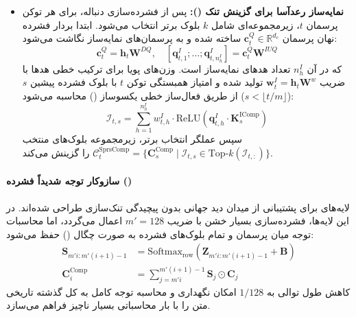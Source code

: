 \begin{itemize}
    \item \textbf{نمایه‌ساز رعدآسا برای گزینش تنک ():} پس از فشرده‌سازی دنباله، برای هر توکن پرسمان $t$، زیرمجموعه‌ای شامل $k$ بلوک برتر انتخاب می‌شود. ابتدا بردار فشرده نهان پرسمان $\mathbf{c}_t^Q \in \mathbb{R}^{d_c}$ ساخته شده و به پرسمان‌های نمایه‌ساز نگاشت می‌شود:
    \begin{equation}
        \mathbf{c}_t^Q = \mathbf{h}_t \mathbf{W}^{DQ}, \quad [\mathbf{q}_{t,1}^I; \dots; \mathbf{q}_{t,n_h^I}^I] = \mathbf{c}_t^Q \mathbf{W}^{IUQ}
    \end{equation}
    که در آن $n_h^I$ تعداد هدهای نمایه‌ساز است. وزن‌های پویا برای ترکیب خطی هدها با ضریب $\mathbf{w}_t^I = \mathbf{h}_t \mathbf{W}^w$ تولید شده و امتیاز همبستگی توکن $t$ با بلوک فشرده پیشین $s$ ($s < \lfloor t/m \rfloor$) از طریق فعال‌ساز خطی یکسوساز () محاسبه می‌شود:
    \begin{equation}
        \mathcal{I}_{t,s} = \sum_{h=1}^{n_h^I} w_{t,h}^I \cdot \text{ReLU}\left( \mathbf{q}_{t,h}^I \cdot \mathbf{K}_s^{\text{IComp}} \right)
    \end{equation}
    سپس عملگر انتخاب برتر، زیرمجموعه بلوک‌های منتخب $\mathcal{C}_t^{\text{SprsComp}} = \{ \mathbf{C}_s^{\text{Comp}} \mid \mathcal{I}_{t,s} \in \text{Top-}k(\mathcal{I}_{t,:}) \}$ را گزینش می‌کند.
\end{itemize}

\paragraph*{سازوکار توجه شدیداً فشرده ()}
لایه‌های  برای پشتیبانی از میدان دید جهانی بدون پیچیدگی تنک‌سازی طراحی شده‌اند. در این لایه‌ها، فشرده‌سازی بسیار خشن با ضریب $m'=128$ اعمال می‌گردد، اما محاسبات توجه میان پرسمان و تمام بلوک‌های فشرده به صورت چگال () حفظ می‌شود:
\begin{align}
    \mathbf{S}_{m'i : m'(i+1)-1} &= \text{Softmax}_{\text{row}}\left( \mathbf{Z}_{m'i : m'(i+1)-1} + \mathbf{B} \right) \\
    \mathbf{C}^{\text{Comp}}_i &= \sum_{j=m'i}^{m'(i+1)-1} \mathbf{S}_j \odot \mathbf{C}_j
\end{align}
کاهش طول توالی به $1/128$ امکان نگهداری و محاسبه توجه کامل به کل گذشته تاریخی متن را با بار محاسباتی بسیار ناچیز فراهم می‌سازد.

